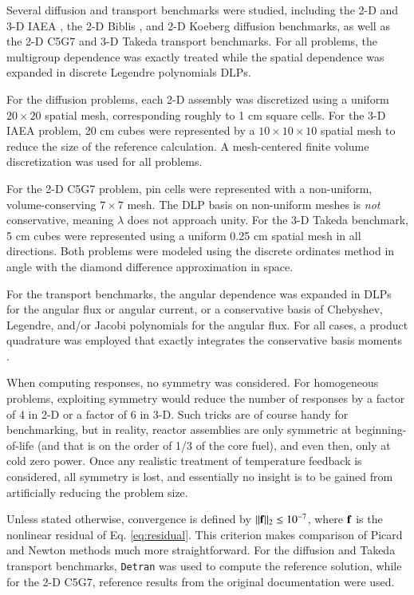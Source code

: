 Several diffusion and transport benchmarks were studied, 
including the 2-D and 3-D IAEA \cite{anl1977benchmark}, the 2-D 
Biblis \cite{muller1991bmd}, and 2-D Koeberg diffusion benchmarks, as well 
as the 2-D C5G7 \cite{lewis2001bsd} 
and 3-D Takeda \cite{takeda1991ntb} transport benchmarks.
For all problems, the multigroup dependence was exactly treated while the 
spatial dependence was expanded in discrete Legendre polynomials 
\cite{mosher2006ifr, roberts2014arm} DLPs.  

For the diffusion 
problems, each 2-D assembly was discretized 
using a uniform $20\times 20$ spatial mesh, corresponding roughly to 
1 cm square cells.  For the 3-D IAEA problem, 20 cm cubes were 
represented by a $10 \times 10 \times 10$ spatial mesh to reduce 
the size of the reference calculation.   A mesh-centered finite 
volume discretization was used for all problems.

For the 2-D C5G7 problem, pin cells were represented with 
a non-uniform, volume-conserving $7\times 7$ 
mesh.   The DLP basis on non-uniform meshes is {\it not} 
conservative, meaning $\lambda$ does not approach unity.
For the 3-D Takeda benchmark, 5 cm 
cubes were represented using a uniform 0.25 cm spatial mesh in 
all directions.  Both problems were modeled using the discrete ordinates 
method in angle with the diamond difference
approximation in space.

For the transport benchmarks, the angular dependence was expanded 
in DLPs for the angular flux or 
angular current, or a conservative basis of Chebyshev, Legendre, 
and/or Jacobi polynomials \cite{roberts2014arm, zhang2012ehs} 
for the angular flux.  For all cases, a product quadrature was employed 
that exactly integrates the conservative basis moments \cite{roberts2014arm}.

When computing responses, no symmetry was considered.  For homogeneous
problems, exploiting symmetry would reduce the number of responses 
by a factor of 4 in 2-D or a factor of 6 in 3-D.  Such tricks are 
of course handy for benchmarking, but in reality, reactor assemblies 
are only symmetric at beginning-of-life (and that is on the order 
of 1/3 of the core fuel), and even then, only at cold zero power.  Once
any realistic treatment of temperature feedback is considered, all 
symmetry is lost, and essentially no insight is to be gained 
from artificially reducing the problem size.

Unless stated otherwise, 
convergence is defined by $||\mathbf{f}||_2 \leq 10^{-7}$, where
$\mathbf{f}$ is the nonlinear residual of Eq. \ref{eq:residual}.
This criterion makes comparison of Picard and Newton methods much 
more straightforward.   For the diffusion and Takeda transport 
benchmarks, {\tt Detran} was used to compute the reference solution, 
while for the 2-D C5G7, reference results from the original 
documentation were used.

